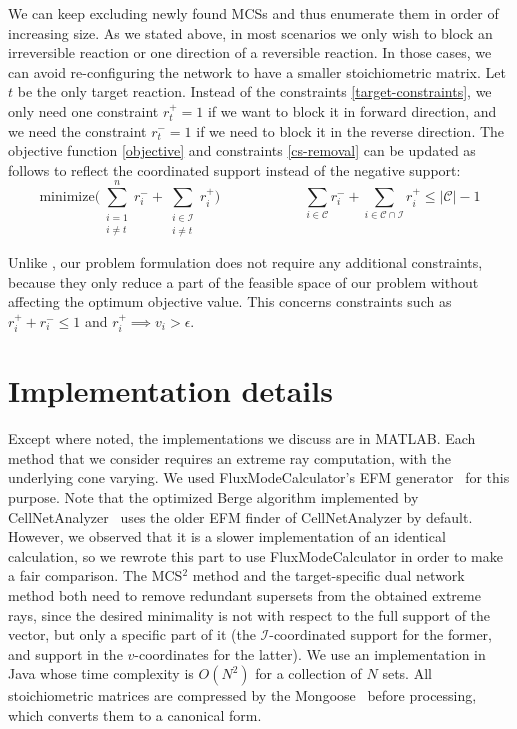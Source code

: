 \documentclass{bioinfo}
\theoremstyle{plain}
\theoremstyle{definition}
\begin{document}
We can keep excluding newly found MCSs and thus enumerate them in order of increasing size. As we stated above, in most scenarios we only wish to block an irreversible reaction or one direction of a reversible reaction. In those cases, we can avoid re-configuring the network to have a smaller stoichiometric matrix. Let $t$ be the only target reaction. Instead of the constraints \eqref{target-constraints}, we only need one constraint $r^{+}_{t} = 1$ if we want to block it in forward direction, and we need the constraint $r^{-}_{t} = 1$ if we need to block it in the reverse direction. The objective function \eqref{objective} and constraints \eqref{cs-removal} can be updated as follows to reflect the coordinated support instead of the negative support:
$$
   \text{minimize} \Big(\sum_{\substack{i=1\\i\neq t}}^{n} r^-_i + \sum_{\substack{i\in\mathcal{I}\\i \neq t}} r^+_i\Big)
\qquad \qquad \qquad
    \sum_{i \in \mathcal{C}} r^-_i + \sum_{i \in \mathcal{C} \cap \mathcal{I}} r^+_i \leq |\mathcal{C}| - 1
$$

Unlike \cite{MCSs-MILP-Dual}, our problem formulation does not require any additional constraints, because they only reduce a part of the feasible space of our problem without affecting the optimum objective value. This concerns constraints such as $r^{+}_i + r^{-}_i \leq 1$ and $ r^{+}_i \implies v_{i} > \epsilon $.
\vspace{-0.7cm}
\section{Implementation details}

Except where noted, the implementations we discuss are in MATLAB. %
Each method that we consider requires an extreme ray computation, with the underlying cone varying. We used FluxModeCalculator's EFM generator~\cite{Fluxcalculator} for this purpose. Note that the optimized Berge algorithm implemented by CellNetAnalyzer~\cite{Cellnet} uses the older EFM finder of CellNetAnalyzer by default. However, we observed that it is a slower implementation of an identical calculation, so we rewrote this part to use FluxModeCalculator in order to make a fair comparison. The MCS$^2$ method and the target-specific dual network method both need to remove redundant supersets from the obtained extreme rays, since the desired minimality is not with respect to the full support of the vector, but only a specific part of it (the $\mathcal{I}$-coordinated support for the former, and support in the $v$-coordinates for the latter). We use an implementation in Java whose time complexity is $O(N^2)$ for a collection of $N$ sets. All stoichiometric matrices are compressed by the Mongoose~\cite{MONGOOSE} before processing, which converts them to a canonical form. %
\end{document}
